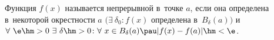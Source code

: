 
Функция $f(x)$ называется непрерывной в~точке $a$, если она определена в~некоторой окрестности 
$a$ $\big(\exists\ \delta_0\colon f(x)$ определена в~$B_\delta(a)\big)$ и 
$\forall\ \e\hm>0\ \exists\ \delta\hm>0\colon \forall\  x\in B_\delta(a)\pau |f(x)-f(a)|\hm<\e$.
